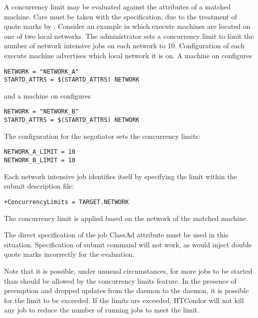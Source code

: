 A concurrency limit may be evaluated against the attributes of a 
matched machine.
Care must be taken with the specification, 
due to the treatment of quote marks by .
Consider an example in which execute machines are located on
one of two local networks.
The administrator sets a concurrency limit to limit the number
of network intensive jobs on each network to 10.
Configuration of each execute machine advertises which
local network it is on. 
A machine on  configures
\begin{verbatim}
NETWORK = "NETWORK_A"
STARTD_ATTRS = $(STARTD_ATTRS) NETWORK
\end{verbatim}
and a machine on  configures
\begin{verbatim}
NETWORK = "NETWORK_B"
STARTD_ATTRS = $(STARTD_ATTRS) NETWORK
\end{verbatim}

The configuration for the negotiator sets the concurrency limits:
\begin{verbatim}
NETWORK_A_LIMIT = 10
NETWORK_B_LIMIT = 10
\end{verbatim}

Each network intensive job identifies itself by specifying the limit
within the submit description file:
\begin{verbatim}
+ConcurrencyLimits = TARGET.NETWORK
\end{verbatim}

The concurrency limit is applied based on the network
of the matched machine.

The direct specification of the job ClassAd attribute 
must be used in this situation.
Specification of submit command 
will not work, as  would inject double quote marks
incorrectly for the evaluation.

Note that it is possible, under unusual circumstances, for more jobs to
be started than should be allowed by the concurrency limits feature.
In the presence of preemption and dropped updates from the
 daemon to the  daemon, 
it is possible for the limit to be exceeded. 
If the limits are exceeded,
HTCondor will not kill any job to reduce the number of running jobs to
meet the limit.
